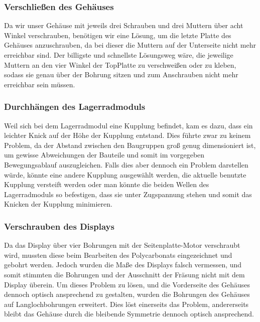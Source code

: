 \subsubsection{Verschließen des Gehäuses}
Da wir unser Gehäuse mit jeweils drei Schrauben und drei Muttern über acht Winkel verschrauben, benötigen
wir eine Lösung, um die letzte Platte des Gehäuses anzuschrauben, da bei dieser die Muttern auf der Unterseite nicht mehr erreichbar sind.
Der billigste und schnellste Lösungsweg wäre,
die jeweilige Muttern an den vier Winkel der TopPlatte zu verschweißen oder zu kleben, sodass sie genau über der
Bohrung sitzen und zum Anschrauben nicht mehr erreichbar sein müssen.

\subsubsection{Durchhängen des Lagerradmoduls}
Weil sich bei dem Lagerradmodul eine Kupplung befindet, kam es dazu, dass ein leichter Knick
auf der Höhe der Kupplung entstand.
Dies führte zwar zu keinem Problem, da der Abstand zwischen den Baugruppen groß genug dimensioniert ist, um gewisse Abweichungen der Bauteile und somit im
vorgegeben Bewegungsablauf auszugleichen.
Falls dies aber dennoch ein Problem darstellen würde, könnte eine andere Kupplung ausgewählt werden, die aktuelle benutzte Kupplung versteift werden oder
man könnte die beiden Wellen des Lagerradmoduls so befestigen, dass sie unter
Zugspannung stehen und somit das Knicken der Kupplung minimieren.

\subsubsection{Verschrauben des Displays}
Da das Display über vier Bohrungen mit der Seitenplatte-Motor verschraubt wird, mussten diese
beim Bearbeiten des Polycarbonats eingezeichnet und gebohrt werden.
Jedoch wurden die Maße des Displays falsch vermessen, und somit stimmten die Bohrungen und der Ausschnitt
der Fräsung nicht mit dem Display überein.
Um dieses Problem zu lösen, und die Vorderseite des Gehäuses dennoch optisch ansprechend zu gestalten, wurden die Bohrungen
des Gehäuses auf Langlochbohrungen erweitert.
Dies löst einerseits das Problem, andererseits
bleibt das Gehäuse durch die bleibende Symmetrie dennoch optisch ansprechend.

